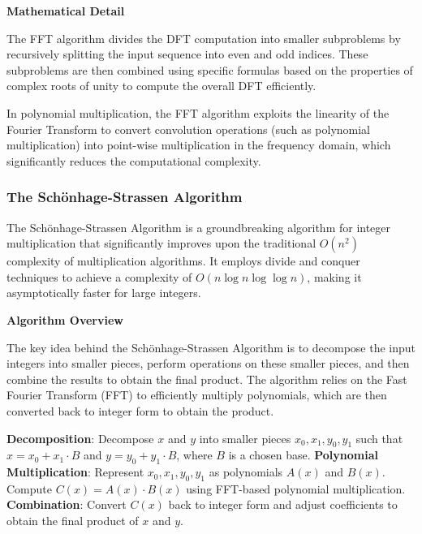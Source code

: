 \documentclass[12pt]{book} %
\begin{document}
\textbf{Mathematical Detail}

The FFT algorithm divides the DFT computation into smaller subproblems by recursively splitting the input sequence into even and odd indices. These subproblems are then combined using specific formulas based on the properties of complex roots of unity to compute the overall DFT efficiently.

In polynomial multiplication, the FFT algorithm exploits the linearity of the Fourier Transform to convert convolution operations (such as polynomial multiplication) into point-wise multiplication in the frequency domain, which significantly reduces the computational complexity.

\subsubsection{The Schönhage-Strassen Algorithm}

The Schönhage-Strassen Algorithm is a groundbreaking algorithm for integer multiplication that significantly improves upon the traditional \(O(n^2)\) complexity of multiplication algorithms. It employs divide and conquer techniques to achieve a complexity of \(O(n \log n \log \log n)\), making it asymptotically faster for large integers.

\textbf{Algorithm Overview}

The key idea behind the Schönhage-Strassen Algorithm is to decompose the input integers into smaller pieces, perform operations on these smaller pieces, and then combine the results to obtain the final product. The algorithm relies on the Fast Fourier Transform (FFT) to efficiently multiply polynomials, which are then converted back to integer form to obtain the product.

\begin{algorithm}[H]
\caption{Schönhage-Strassen Algorithm for Integer Multiplication}
\begin{algorithmic}[1]
    \State \textbf{Decomposition}:
    \State Decompose $x$ and $y$ into smaller pieces $x_0, x_1, y_0, y_1$ such that $x = x_0 + x_1 \cdot B$ and $y = y_0 + y_1 \cdot B$, where $B$ is a chosen base.
    \State \textbf{Polynomial Multiplication}:
    \State Represent $x_0, x_1, y_0, y_1$ as polynomials $A(x)$ and $B(x)$.
    \State Compute $C(x) = A(x) \cdot B(x)$ using FFT-based polynomial multiplication.
    \State \textbf{Combination}:
    \State Convert $C(x)$ back to integer form and adjust coefficients to obtain the final product of $x$ and $y$.
\EndProcedure
\end{algorithmic}
\end{algorithm}
\end{document}
